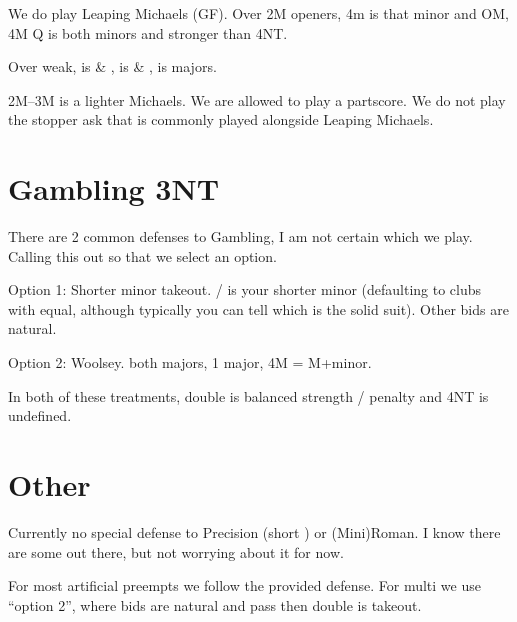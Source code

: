 \documentclass[tom-ari]{subfile}
\begin{document}
	We do play Leaping Michaels (GF). Over 2M openers, 4m is that minor and OM, 4M Q is both minors and stronger than 4NT. 
	
	Over  weak,  is \clubsuit \& \heartsuit,  is \clubsuit \& \spadesuit,  is majors.
	
	2M--3M is a lighter Michaels. We are allowed to play a partscore. We do not play the stopper ask that is commonly played alongside Leaping Michaels.
		
	\section{Gambling 3NT}
	
	There are 2 common defenses to Gambling, I am not certain which we play. Calling this out so that we select an option.
	
	Option 1:  Shorter minor takeout. / is your shorter minor (defaulting to clubs with equal, although typically you can tell which is the solid suit). Other bids are natural.
	
	Option 2:  Woolsey.  both majors,  1 major, 4M = M+minor.
	
	In both of these treatments, double is balanced strength / penalty and 4NT is undefined.
	
	\section{Other}
	
	Currently no special defense to  Precision (short \diamondsuit) or (Mini)Roman. I know there are some out there, but not worrying about it for now.
	
	For most artificial preempts we follow the provided defense. For multi we use ``option 2'', where bids are natural and pass then double is takeout.
	
\end{document}
